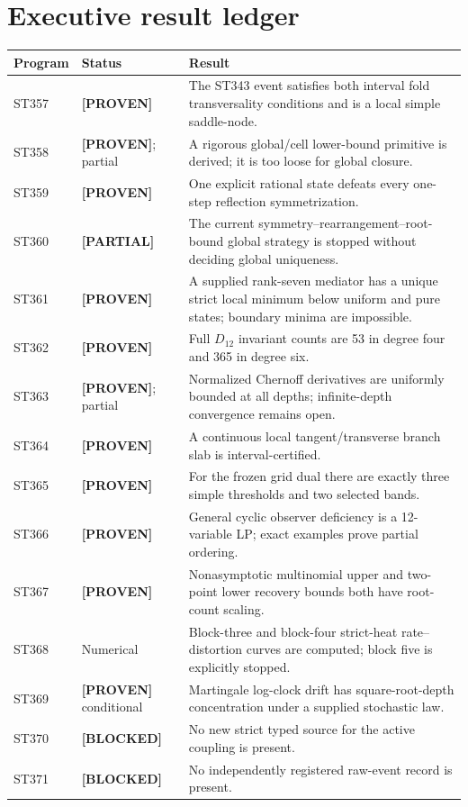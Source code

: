 \documentclass[11pt,a4paper]{article}
\newcommand{\Proven}{\textcolor{proved}{\textbf{[PROVEN]}}}
\newcommand{\Partial}{\textcolor{conditional}{\textbf{[PARTIAL]}}}
\newcommand{\Blocked}{\textcolor{blocked}{\textbf{[BLOCKED]}}}
\begin{document}
\section{Executive result ledger}
\small
\begin{longtable}{>{\raggedright\arraybackslash}p{}>{\raggedright\arraybackslash}p{}>{\raggedright\arraybackslash}p{}}
\toprule Program&Status&Result\\\midrule\endhead
ST357&\Proven&The ST343 event satisfies both interval fold transversality conditions and is a local simple saddle-node.\\
ST358&\Proven{}; partial&A rigorous global/cell lower-bound primitive is derived; it is too loose for global closure.\\
ST359&\Proven&One explicit rational state defeats every one-step reflection symmetrization.\\
ST360&\Partial&The current symmetry--rearrangement--root-bound global strategy is stopped without deciding global uniqueness.\\
ST361&\Proven&A supplied rank-seven mediator has a unique strict local minimum below uniform and pure states; boundary minima are impossible.\\
ST362&\Proven&Full $D_{12}$ invariant counts are 53 in degree four and 365 in degree six.\\
ST363&\Proven{}; partial&Normalized Chernoff derivatives are uniformly bounded at all depths; infinite-depth convergence remains open.\\
ST364&\Proven&A continuous local tangent/transverse branch slab is interval-certified.\\
ST365&\Proven&For the frozen grid dual there are exactly three simple thresholds and two selected bands.\\
ST366&\Proven&General cyclic observer deficiency is a 12-variable LP; exact examples prove partial ordering.\\
ST367&\Proven&Nonasymptotic multinomial upper and two-point lower recovery bounds both have root-count scaling.\\
ST368&Numerical&Block-three and block-four strict-heat rate--distortion curves are computed; block five is explicitly stopped.\\
ST369&\Proven{} conditional&Martingale log-clock drift has square-root-depth concentration under a supplied stochastic law.\\
ST370&\Blocked&No new strict typed source for the active coupling is present.\\
ST371&\Blocked&No independently registered raw-event record is present.\\
\bottomrule
\end{longtable}\normalsize
\end{document}
